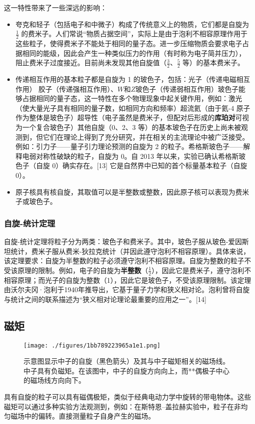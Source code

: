 这一特性带来了一些深远的影响： 
\begin{itemize}
\item 夸克和轻子（包括电子和中微子）构成了传统意义上的物质，它们都是自旋为 \( \frac{1}{2} \) 的费米子。人们常说“物质占据空间”，实际上是由于泡利不相容原理作用于这些粒子，使得费米子不能处于相同的量子态。进一步压缩物质会要求电子占据相同的能级，因此会产生一种类似压力的作用（有时称为电子简并压力），阻止费米子过度接近。目前尚未发现其他自旋值（\( \frac{3}{2} \)、\( \frac{5}{2} \) 等）的基本费米子。  
\item 传递相互作用的基本粒子都是自旋为 1 的玻色子，包括：光子（传递电磁相互作用） 胶子（传递强相互作用）、\(W\)和\(Z\)玻色子（传递弱相互作用）玻色子能够占据相同的量子态，这一特性在多个物理现象中起关键作用，例如：激光（使大量光子具有相同的量子数，如相同方向和频率）超流氦（由于氦-4 原子作为整体是玻色子）超导性（电子虽然是费米子，但配对后形成的\textbf{库珀对}可视为一个复合玻色子）其他自旋（0、2、3 等）的基本玻色子在历史上尚未被观测到，但它们在理论上得到了充分研究，并在相关的主流理论中被广泛接受。例如：引力子——量子引力理论预测的自旋为 2 的粒子。希格斯玻色子——解释电弱对称性破缺的粒子，自旋为 0。自 2013 年以来，实验已确认希格斯玻色子（自旋 0）确实存在。[13] 它是自然界中已知的首个标量基本粒子（自旋 0）。  
\item 原子核具有核自旋，其取值可以是半整数或整数，因此原子核可以表现为费米子或玻色子。
\end{itemize}
\subsubsection{自旋-统计定理}  
自旋-统计定理将粒子分为两类：玻色子和费米子。其中，玻色子服从玻色-爱因斯坦统计，费米子服从费米-狄拉克统计（并因此遵守泡利不相容原理）。具体来说，该定理要求：自旋为半整数的粒子必须遵守泡利不相容原理。自旋为整数的粒子不受该原理的限制。例如，电子的自旋为\textbf{半整数}（\(\frac{1}{2}\)），因此它是费米子，遵守泡利不相容原理；而光子的自旋为整数（1），因此它是玻色子，不受该原理限制。该定理由沃尔夫冈·泡利于1940年推导出，它基于量子力学和狭义相对论。泡利曾将自旋与统计之间的联系描述为“狭义相对论理论最重要的应用之一”。[14]
\subsection{磁矩}
\begin{figure}[ht]
\centering
\texttt{[image: ./figures/1bb789223965a1e1.png]}
\caption{示意图显示中子的自旋（黑色箭头）及其与中子磁矩相关的磁场线。中子具有负磁矩。在该图中，中子的自旋方向向上，而**偶极子中心的磁场线方向向下。} \label{fig_Spin1_1}
\end{figure}
具有自旋的粒子可以具有磁偶极矩，类似于经典电动力学中旋转的带电物体。这些磁矩可以通过多种实验方法观测到，例如：在斯特恩–盖拉赫实验中，粒子在非均匀磁场中的偏转。直接测量粒子自身产生的磁场。

